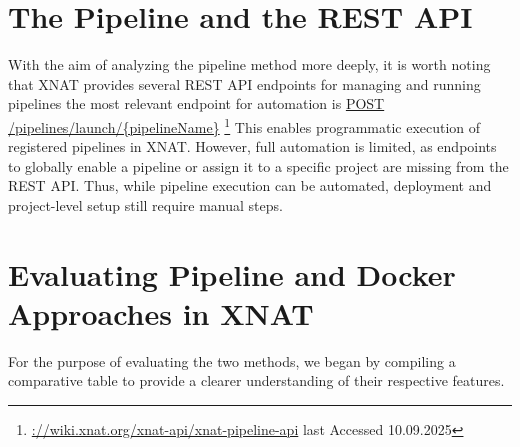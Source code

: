 \section{The Pipeline and the REST API}
With the aim of analyzing the pipeline method more deeply, it is worth noting that XNAT provides several REST API endpoints for managing and running pipelines the most relevant endpoint for automation is \url{POST /pipelines/launch/{pipelineName}} \footnote{\url{://wiki.xnat.org/xnat-api/xnat-pipeline-api} last Accessed 10.09.2025}
This enables programmatic execution of registered pipelines in XNAT. However, full automation is limited, as endpoints to globally enable a pipeline or assign it to a specific project are missing from the REST API. Thus, while pipeline execution can be automated, deployment and project-level setup still require manual steps.

\section{Evaluating Pipeline and Docker Approaches in XNAT}

For the purpose of evaluating the two methods, we began by compiling a comparative table to provide a clearer understanding of their respective features. 

